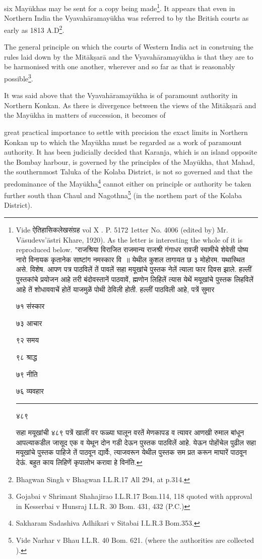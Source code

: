 \documentclass[11pt, openany]{book}
\begin{document}
\noindent
six Mayūkhas may be sent for a copy being made\renewcommand{\thefootnote}{1}\footnote{Vide ऐतिहासिकलेखसंग्रह vol X . P. 5172 1etter No. 4006 (edited by) Mr. Vāsudevs'āstri Khare, 1920). As the letter is interesting the whole of it is reproduced below. "राजश्रिया विराजित राजमान्य राजश्री गंगाधर रावजी स्वामीचे शेवेसी पोष्य नारो विनायक कृतानेक साष्टांग नमस्कार वि~॥ येथील कुशल तागायत छ ३ मोहोरम. यथास्थित असे. विशेष. आपण पत्र पाठविलें तें पावलें {\qt सहा मयूखांचे पुस्तक नेलें त्याला फार दिवस झाले. हल्लीं पुस्तकांचे प्रयोजन आहे तरी बंदोवस्तानें पाठवावें,} ह्मणोन लिहिलें त्यास येथें मयूखांचे पुस्तक लिहविलें आहे तें शोधाववाचें होतें याजमुळें पोथी ठेविली होती. हल्लीं पाठविली आहे, पत्रें सुमार\textendash

७१ संस्कार

७३ आचार

९२ समय

९८ श्राद्ध

७९ नीति

७६ व्यवहार

\rule{0.05\linewidth}{0.5pt}

४८९ 

सहा मयूखांची ४८९ पत्रें खालीं वर फळ्या घालून वरतें मेणकापड व त्यावर आणखी रुमाल बांधून आपल्याकडील जासूद एक व येथून दोन गडी देऊन पुस्तक पाठविलें आहे. येऊन पोहोंचेल पुढील सहा मयूखांचे पुस्तक पाहिजे तें पाठवून द्यार्वेः, त्याजवरून येथील पुस्तक सम प्रत करून माघारें पाठवून देऊं. बहुत काय लिहिणें कृपालोभ करावा हे विनंति.}. It appears that even in Northern India the Vyavahāramayūkha was referred to by the British courts as early as 1813 A.D\renewcommand{\thefootnote}{2}\footnote{Bhagwan Singh v Bhagwan I.L.R.17 All 294, at p.314.}.

The general principle on which the courts of Western India act in construing the rules laid down by the Mitākṣarā and the Vyavahāramayūkha is that they are to be harmonised with one another, wherever and so far as that is reasonably possible\renewcommand{\thefootnote}{3}\footnote{Gojabai v Shrimant Shahajirao I.L.R.17 Bom.114, 118 quoted with approval in Kesserbai v Hunsraj I.L.R. 30 Bom. 431, 432 (P.C.)}.

It was said above that the Vyavahāramayūkha is of paramount authority in Northern Konkan. As there is divergence between the views of the Mitākṣarā and the Mayūkha in matters of succession, it becomes of

\newpage

\noindent
great practical importance to settle with precision the exact limits in Northern Konkan up to which the Mayūkha must be regarded as a work of paramount authority. It has been judicially decided that Karanja, which is an island opposite the Bombay harbour, is governed by the principles of the Mayūkha, that Mahad, the southernmost Taluka of the Kolaba District, is not so governed and that the predominance of the Mayūkha\renewcommand{\thefootnote}{1}\footnote{Sakharam Sadashiva Adhikari v Sitabai I.L.R.3 Bom.353.} cannot either on principle or authority be taken further south than Chaul and Nagothna\renewcommand{\thefootnote}{2}\footnote{Vide Narhar v Bhau I.L.R. 40 Bom. 621. (where the authorities are collected ).} (in the northem part of the Kolaba District).
\end{document}

